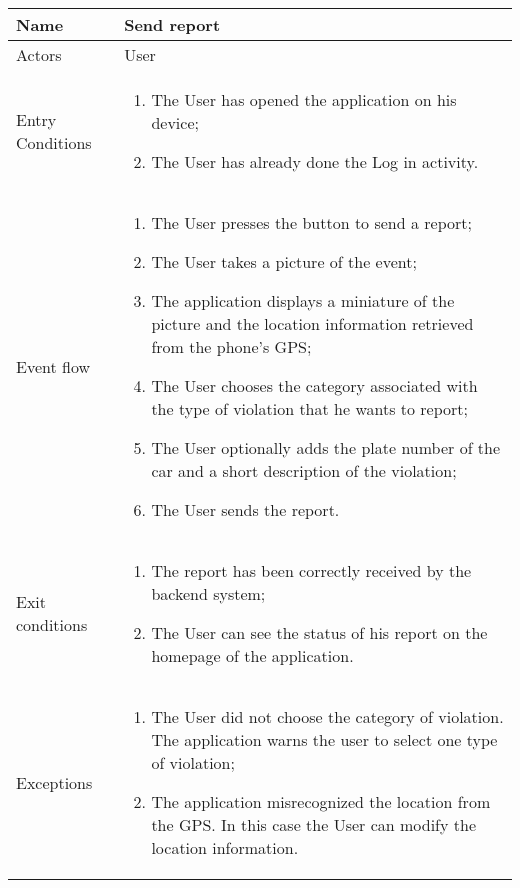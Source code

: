 \begin{table}[H]
  \centering
  \begin{tabularx}{\textwidth}{ |l|X| }
    \hline
    Name & Send report\\
    \hline
    Actors & User\\
    \hline
    Entry Conditions & \begin{enumerate}[noitemsep]
                        \item The User has opened the application on his device;
                        \item The User has already done the Log in activity.
                      \end{enumerate}\\
    \hline
    Event flow & \begin{enumerate}[noitemsep]
                    \item The User presses the button to send a report;
                    \item The User takes a picture of the event;
                    \item The application displays a miniature of the picture and the location information retrieved from the phone's GPS;
                    \item The User chooses the category associated with the type of violation that he wants to report;
                    \item The User optionally adds the plate number of the car and a short description of the violation;
                    \item The User sends the report.
                \end{enumerate}\\
    \hline
    Exit conditions & \begin{enumerate}[noitemsep]
                        \item  The report has been correctly received by the backend system;
                        \item The User can see the status of his report on the homepage of the application.
                      \end{enumerate}\\
    \hline
    Exceptions & \begin{enumerate}[noitemsep]
                  \item The User did not choose the category of violation. The application warns the user to select one type of violation;
                  \item The application misrecognized the location from the GPS. In this case the User can modify the location information.
                \end{enumerate}\\
    \hline
  \end{tabularx}
\end{table}
